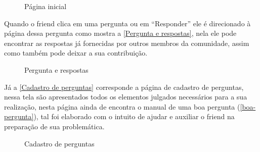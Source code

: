 \begin{figure}[htb]
\centering
\caption{\label{Home Page} Página inicial}

\end{figure}
\FloatBarrier

Quando o \gls{friend} clica em uma pergunta ou em ``Responder'' ele é direcionado à página dessa pergunta como mostra a \autoref{Pergunta e respostas}, nela ele pode encontrar as respostas já fornecidas por outros membros da comunidade, assim como também pode deixar a sua contribuição.

\begin{figure}[htb]
\centering
\caption{\label{Pergunta e respostas} Pergunta e respostas}

\end{figure}
\FloatBarrier

Já a \autoref{Cadastro de perguntas} corresponde a página de cadastro de perguntas, nessa tela são apresentados todos os elementos julgados necessários para a sua realização, nesta página ainda de encontra o manual de uma boa pergunta (\autoref{boa-pergunta}), tal foi elaborado com o intuito de ajudar e auxiliar o \gls{friend} na preparação de sua problemática. 

\begin{figure}[htb]
\centering
\caption{\label{Cadastro de perguntas} Cadastro de perguntas}

\end{figure}
\FloatBarrier
